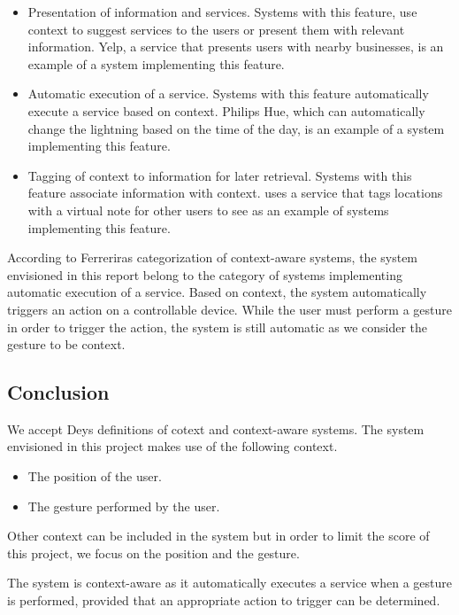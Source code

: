 \begin{itemize}
\item Presentation of information and services. Systems with this feature, use context to suggest services to the users or present them with relevant information. Yelp, a service that presents users with nearby businesses, is an example of a system implementing this feature.
\item Automatic execution of a service. Systems with this feature automatically execute a service based on context. Philips Hue, which can automatically change the lightning based on the time of the day, is an example of a system implementing this feature.
\item Tagging of context to information for later retrieval. Systems with this feature associate information with context. \cite{ferreira2014distributed} uses a service that tags locations with a virtual note for other users to see as an example of systems implementing this feature.
\end{itemize}

According to Ferreriras categorization of context-aware systems, the system envisioned in this report belong to the category of systems implementing automatic execution of a service. Based on context, the system automatically triggers an action on a controllable device. While the user must perform a gesture in order to trigger the action, the system is still automatic as we consider the gesture to be context.

\subsection{Conclusion}

We accept Deys definitions of cotext and context-aware systems. The system envisioned in this project makes use of the following context.

\begin{itemize}
\item The position of the user.
\item The gesture performed by the user.
\end{itemize}

Other context can be included in the system but in order to limit the score of this project, we focus on the position and the gesture.

The system is context-aware as it automatically executes a service when a gesture is performed, provided that an appropriate action to trigger can be determined.

